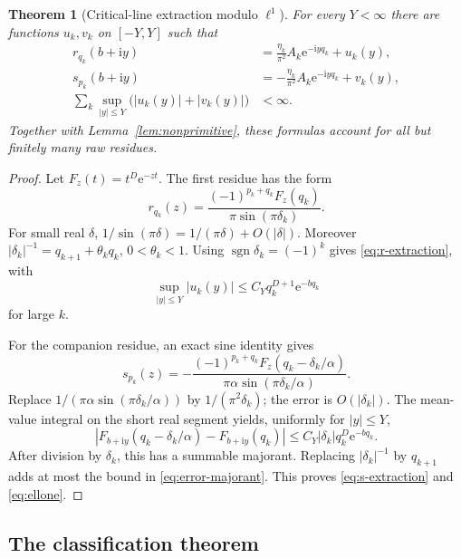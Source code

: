 \documentclass[11pt,a4paper]{article}
\numberwithin{equation}{section}
\newtheorem{theorem}{Theorem}[section]
\theoremstyle{definition}
\theoremstyle{remark}
\newcommand{\e}{\mathrm e}
\newcommand{\ii}{\mathrm i}
\begin{document}
\begin{theorem}[Critical-line extraction modulo \(\ell^1\)]
\label{thm:extraction}
For every $Y<\infty$ there are functions $u_k,v_k$ on $[-Y,Y]$ such that
\begin{align}
 r_{q_k}(b+\ii y)
    &=\frac{\eta_k}{\pi^2}A_k\e^{-\ii yq_k}+u_k(y),
       \label{eq:r-extraction}\\
 s_{p_k}(b+\ii y)
    &=-\frac{\eta_k}{\pi^2}A_k\e^{-\ii yq_k}+v_k(y),
       \label{eq:s-extraction}\\
 \sum_k\sup_{|y|\le Y}\bigl(|u_k(y)|+|v_k(y)|\bigr)&<\infty.
       \label{eq:ellone}
\end{align}
Together with Lemma~\ref{lem:nonprimitive}, these formulas account for
all but finitely many raw residues.
\end{theorem}
\begin{proof}
Let $F_z(t)=t^D\e^{-zt}$. The first residue has the form
\[
 r_{q_k}(z)=\frac{(-1)^{p_k+q_k}F_z(q_k)}{\pi\sin(\pi\delta_k)}.
\]
For small real $\delta$, $1/\sin(\pi\delta)=1/(\pi\delta)+O(|\delta|)$.
Moreover
$|\delta_k|^{-1}=q_{k+1}+\theta_kq_k$, $0<\theta_k<1$.
Using $\operatorname{sgn}\delta_k=(-1)^k$ gives
\eqref{eq:r-extraction}, with
\begin{equation}
 \sup_{|y|\le Y}|u_k(y)|\le C_Yq_k^{D+1}\e^{-bq_k}
 \label{eq:error-majorant}
\end{equation}
for large $k$.

For the companion residue, an exact sine identity gives
\[
 s_{p_k}(z)
 =-\frac{(-1)^{p_k+q_k}F_z(q_k-\delta_k/\alpha)}
             {\pi\alpha\sin(\pi\delta_k/\alpha)}.
\]
Replace $1/(\pi\alpha\sin(\pi\delta_k/\alpha))$ by
$1/(\pi^2\delta_k)$; the error is $O(|\delta_k|)$.
The mean-value integral on the short real segment yields, uniformly for
$|y|\le Y$,
\[
 |F_{b+\ii y}(q_k-\delta_k/\alpha)-F_{b+\ii y}(q_k)|
 \le C_Y|\delta_k|q_k^D\e^{-bq_k}.
\]
After division by $\delta_k$, this has a summable majorant. Replacing
$|\delta_k|^{-1}$ by $q_{k+1}$ adds at most the bound in
\eqref{eq:error-majorant}. This proves \eqref{eq:s-extraction} and
\eqref{eq:ellone}.
\end{proof}

\subsection{The classification theorem}
\end{document}
